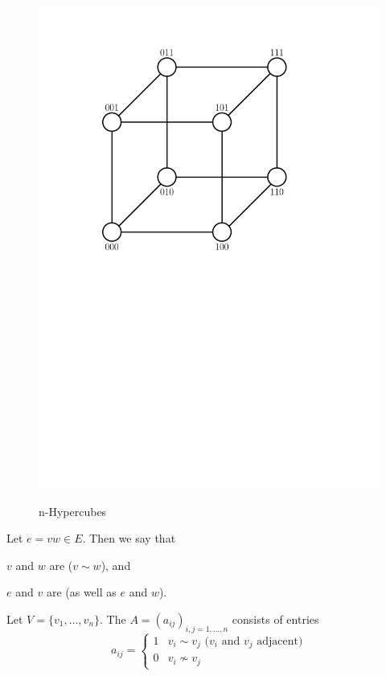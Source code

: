 \begin{figure}[htb]
{	\includegraphics[scale=.4]{01_graph_theory/pics/3D-cube.pdf}
}
\caption{n-Hypercubes}
\end{figure}
\FloatBarrier

\begin{definition}
Let $e=vw\in E$. Then we say that
\begin{compactitem}
\item $v$ and $w$ are  ($v\sim w$), and
\item $e$ and $v$ are  (as well as $e$ and $w$).
\end{compactitem}
\end{definition}

\begin{definition}
Let $V=\{v_1,\ldots,v_n\}.$ The  $A =
(a_{ij})_{i,j=1,\ldots,n}$ consists of entries
\[
  a_{ij} = \begin{cases}
    1 & v_i\sim v_j\text{ ($v_i$ and $v_j$ adjacent)} \\
    0 & v_i\not\sim v_j
  \end{cases}
\]
\end{definition}

